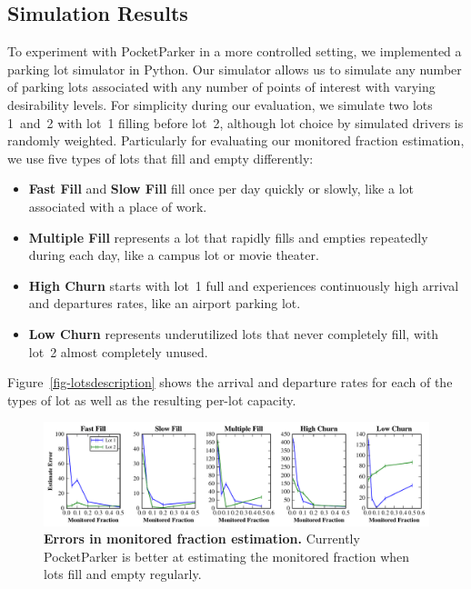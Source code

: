 \subsection{Simulation Results}
\label{subsec-simulator}

To experiment with PocketParker in a more controlled setting, we implemented
a parking lot simulator in Python. Our simulator allows us to simulate any
number of parking lots associated with any number of points of interest with
varying desirability levels. For simplicity during our evaluation, we
simulate two lots 1~and~2 with lot~1 filling before lot~2, although lot
choice by simulated drivers is randomly weighted. Particularly for evaluating
our monitored fraction estimation, we use five types of lots that fill and
empty differently:

\begin{itemize}

\item \textbf{Fast Fill} and \textbf{Slow Fill} fill once per day quickly or
slowly, like a lot associated with a place of work.

\item \textbf{Multiple Fill} represents a lot that rapidly fills and empties
repeatedly during each day, like a campus lot or movie theater.

\item \textbf{High Churn} starts with lot~1 full and experiences continuously
high arrival and departures rates, like an airport parking lot.

\item \textbf{Low Churn} represents underutilized lots that never completely
fill, with lot~2 almost completely unused.

\end{itemize}

Figure~\ref{fig-lotsdescription} shows the arrival and departure rates for
each of the types of lot as well as the resulting per-lot capacity.

\begin{figure}
\centering
\includegraphics[width=\textwidth]{./simulator/figures/capacity_experiment.pdf}

\caption{\textbf{Errors in monitored fraction estimation.} Currently
PocketParker is better at estimating the monitored fraction when lots fill
and empty regularly.}

\label{fig-capacityerrors}
\end{figure}

